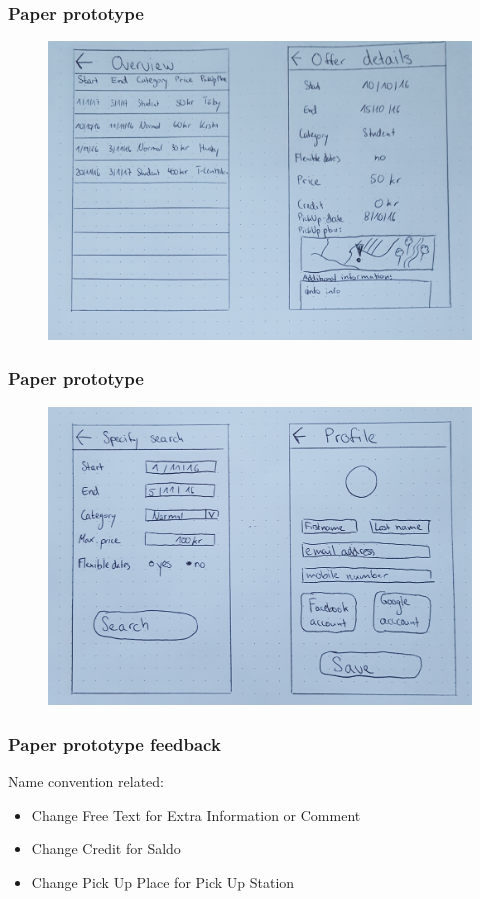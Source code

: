 \documentclass{beamer}
\begin{document}

\begin{frame}
\frametitle{Paper prototype}
\begin{figure}
\includegraphics[width=0.8\linewidth]{jpg/paper-prototype-2-a}
\end{figure}
\end{frame}


\begin{frame}
\frametitle{Paper prototype}
\begin{figure}
\includegraphics[width=0.8\linewidth]{jpg/paper-prototype-2-b}
\end{figure}
\end{frame}


\begin{frame}
\frametitle{Paper prototype feedback}
Name convention related:
\begin{itemize}
\item Change Free Text for Extra Information or Comment
\item Change Credit for Saldo
\item Change Pick Up Place for Pick Up Station
\end{itemize}
\end{frame}
\end{document}
